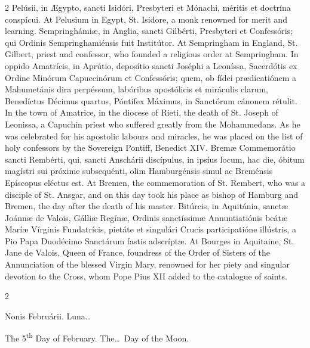 \begin{paracol}{2}
Pelúsii, in Ægypto, sancti Isidóri, Presbyteri 
 et Mónachi, méritis et doctrína conspícui.
\switchcolumn
{}
At Pelusium in Egypt, St. Isidore, a monk renowned for merit and learning.
\switchcolumn*
{}
Sempringhámiæ, in Anglia, sancti Gilbérti, 
 Presbyteri et Confessóris; qui Ordinis Sempringhamiénsis fuit Institútor.
\switchcolumn
{}
At Sempringham in England, St. Gilbert, priest and confessor, who founded a 
 religious order at Sempringham.
\switchcolumn*
{}
In oppido Amatrícis, in Aprútio, deposítio sancti Joséphi a Leoníssa, 
 Sacerdótis ex Ordine Minórum Capuccinórum et Confessóris; quem, ob fídei prædicatiónem 
 a Mahumetánis dira perpéssum, labóribus apostólicis et miráculis clarum, 
 Benedíctus Décimus quartus, Póntifex Máximus, in Sanctórum cánonem rétulit.
\switchcolumn
{}
In the town of Amatrice, in the diocese of Rieti, the death of St. Joseph of 
 Leonissa, a Capuchin priest who suffered greatly from the Mohammedans. 
 As he was celebrated for his apostolic labours and miracles, he was placed 
 on the list of holy confessors by the Sovereign Pontiff, Benedict XIV.
\switchcolumn*
{}
Bremæ Commemorátio sancti Rembérti, qui, sancti 
 Anschárii discípulus, in ipsíus locum, hac die, óbitum magístri sui próxime 
 subsequénti, olim Hamburgénsis simul ac Breménsis Epíscopus eléctus est.
\switchcolumn
{}
At Bremen, the commemoration of St. Rembert, who was a disciple of St. 
 Ansgar, and on this day took his place as bishop of Hamburg and Bremen, the 
 day after the death of his master.
\switchcolumn*
{}
Bitúrcis, in Aquitánia, sanctæ Joánnæ de Valois, 
 Gálliæ Regínæ, Ordinis sanctíssimæ Annuntiatiónis beátæ Maríæ Vírginis 
 Fundatrícis, pietáte et singulári Crucis participatióne illústris, a Pio 
 Papa Duodécimo Sanctárum fastis adscríptæ.
\switchcolumn
{}
At Bourges in Aquitaine, St. Jane de Valois, Queen of France, foundress of 
 the Order of Sisters of the Annunciation of the blessed Virgin Mary, 
 renowned for her piety and singular devotion to the Cross, whom Pope Pius 
 XII added to the catalogue of saints.
\switchcolumn*
{}
\end{paracol}


\begin{paracol}{2}
\begin{center}{\color{gregoriocolor} Nonis Februárii. 
 Luna\dots\ }\end{center}
\switchcolumn
{}
\begin{center}{\color{gregoriocolor} The 5\textsuperscript{th} Day of 
 February. The\dots\ Day of the Moon.}\end{center}
\end{paracol}

